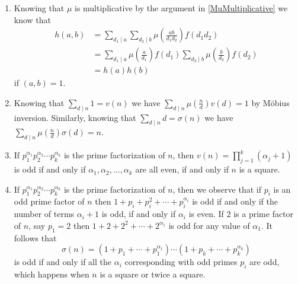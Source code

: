 \documentclass[12pt]{article}
\begin{document}
\begin{enumerate}
\item %
Knowing that $\mu$ is multiplicative by the argument
in \autoref{MuMultiplicative} we know that
\begin{align*}
h\left(a,b\right)
&=\sum_{d_1\mid a}\sum_{d_2\mid b}
\mu\left(\frac{ab}{d_1d_2}\right)f\left(d_1d_2\right)\\
&=\sum_{d_1\mid a}
\mu\left(\frac{a}{d_1}\right)f\left(d_1\right)
\sum_{d_2\mid b}
\mu\left(\frac{b}{d_2}\right)f\left(d_2\right)\\
&=h\left(a\right)h\left(b\right)
\end{align*}
if $\left(a,b\right)=1$.

\item %
Knowing that $\sum_{d\mid n}1=v\left(n\right)$
we have $\sum_{d\mid n}\mu\left(\frac{n}{d}\right)v\left(d\right)=1$
by M\"obius inversion.
Similarly, knowing that $\sum_{d\mid n}d=\sigma\left(n\right)$
we have $\sum_{d\mid n}\mu\left(\frac{n}{d}\right)\sigma\left(d\right)=n$.

\item %
If $p_1^{\alpha_1}p_2^{\alpha_2}\cdots p_k^{\alpha_k}$
is the prime factorization of $n$, then
$v\left(n\right)=\prod_{j=1}^k\left(\alpha_j+1\right)$
is odd if and only if $\alpha_1,\alpha_2,\ldots,\alpha_k$
are all even, if and only if $n$ is a square.

\item %
If $p_1^{\alpha_1}p_2^{\alpha_2}\cdots p_k^{\alpha_k}$
is the prime factorization of $n$, then
we observe that if $p_i$ is an odd prime factor of $n$ then
$1+p_i+p_i^2+\cdots+p_i^{\alpha_i}$ is odd if and only
if the number of terms
$\alpha_i+1$ is odd, if and only if $\alpha_i$ is even.
If $2$ is a prime factor of $n$, say $p_1=2$ then
$1+2+2^2+\cdots +2^{\alpha_1}$ is odd for any value of $\alpha_1$.
It follows that
\[\sigma\left(n\right)=\left(1+p_1+\cdots+p_1^{\alpha_1}\right)
\cdots\left(1+p_k+\cdots+p_k^{\alpha_k}\right)\]
is odd if and only if
all the $\alpha_i$ corresponding with odd primes $p_i$
are odd, which happens when $n$ is a square or twice a square.

\end{enumerate}
\end{document}
